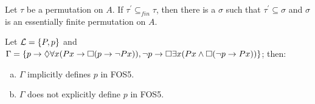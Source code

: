 \begin{pro}
Let $\tau$ be a permutation on $A$. If $\tau^{\prime} \subseteq_{fin} \tau$, then there is a $\sigma$ such that $\tau^{\prime} \subseteq \sigma$ and $\sigma$ is an essentially finite permutation on $A$.
\end{pro}

\begin{pro}
Let $\mathcal{L} =\{P,p\}$ and $\Gamma =\{p \rightarrow \Diamond\forall x (Px \rightarrow \Box (p \rightarrow \neg Px)), \neg p \rightarrow \Box \exists x (Px \wedge \Box (\neg p \rightarrow Px))\}$; then:
\begin{enumerate}[(a)]
\item $\Gamma$ implicitly defines $p$ in FOS5.
\item $\Gamma$ does not explicitly define $p$ in FOS5.
\end{enumerate}
\end{pro}

